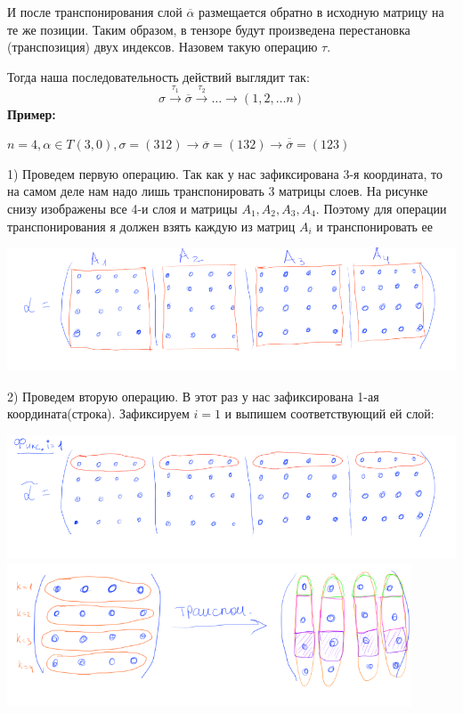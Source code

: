 И после транспонирования слой $\overline{\alpha}$ размещается обратно в исходную матрицу на те же позиции. Таким образом, в тензоре будут произведена перестановка (транспозиция) двух индексов. Назовем такую операцию $\tau$.

Тогда наша последовательность действий выглядит так:
$$\sigma \xrightarrow{\tau_1}\overline{\sigma}\xrightarrow{\tau_2}\ldots \xrightarrow{} (1,2,\ldots n)$$
\textbf{Пример:}

$n = 4, \alpha \in T(3,0), \sigma = (3 12)\rightarrow \overline{\sigma} =  (132) \rightarrow \overline{\overline{\sigma }} = (123)$

1) Проведем первую операцию. Так как у нас зафиксирована 3-я координата, то на самом деле нам надо лишь транспонировать 3 матрицы слоев. На рисунке снизу изображены все 4-и слоя и матрицы $A_1,A_2,A_3,A_4$. Поэтому для операции транспонирования я должен взять каждую из матриц $A_i$ и транспонировать ее
\begin{center}
         \includegraphics[width = 18cm]{assets/8_4-sample-1.png}
 \end{center}
2) Проведем вторую операцию. В этот раз у нас зафиксирована 1-ая координата(строка). Зафиксируем $i=1$ и выпишем соответствующий ей слой:
\begin{center}
         \includegraphics[width = 18cm]{assets/8_4-sample-2.png}
         \includegraphics[width = 12cm]{assets/8_4-sample-3.png}
 \end{center}
